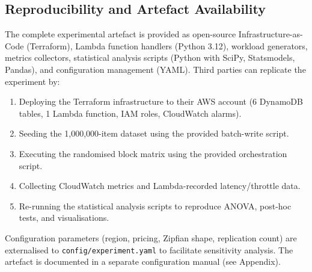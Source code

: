 \subsection{Reproducibility and Artefact Availability}

The complete experimental artefact is provided as open-source Infrastructure-as-Code (Terraform), Lambda function handlers (Python 3.12), workload generators, metrics collectors, statistical analysis scripts (Python with SciPy, Statsmodels, Pandas), and configuration management (YAML). Third parties can replicate the experiment by:

\begin{enumerate}
    \item Deploying the Terraform infrastructure to their AWS account (6 DynamoDB tables, 1 Lambda function, IAM roles, CloudWatch alarms).
    \item Seeding the 1,000,000-item dataset using the provided batch-write script.
    \item Executing the randomised block matrix using the provided orchestration script.
    \item Collecting CloudWatch metrics and Lambda-recorded latency/throttle data.
    \item Re-running the statistical analysis scripts to reproduce ANOVA, post-hoc tests, and visualisations.
\end{enumerate}

Configuration parameters (region, pricing, Zipfian shape, replication count) are externalised to \texttt{config/experiment.yaml} to facilitate sensitivity analysis. The artefact is documented in a separate configuration manual (see Appendix).

